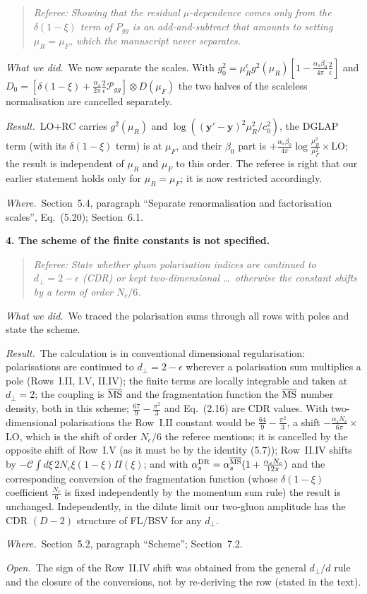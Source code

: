 \documentclass[a4paper,11pt]{article}
\def\v#1{\mathbf{#1}}
\newcommand{\MS}{\overline{\rm MS}}
\newcommand{\point}[1]{\par\medskip\noindent\textbf{#1}\par}
\newcommand{\referee}[1]{\begin{quote}\small\emph{Referee:} \emph{#1}\end{quote}}
\newcommand{\done}{\par\noindent\emph{What we did.}\ }
\newcommand{\result}{\par\noindent\emph{Result.}\ }
\newcommand{\where}{\par\noindent\emph{Where.}\ }
\newcommand{\open}{\par\noindent\emph{Open.}\ }
\begin{document}
\referee{Showing that the residual $\mu$-dependence comes only from the $\delta(1-\xi)$ term of $P_{gg}$ is an add-and-subtract that amounts to setting $\mu_R=\mu_F$, which the manuscript never separates.}
\done We now separate the scales. With $g_0^2=\mu_R^\epsilon g^2(\mu_R)[1-\frac{\alpha_s\beta_0}{4\pi}\frac2\epsilon]$ and $D_0=[\delta(1-\xi)+\frac{\alpha_s}{2\pi}\frac2\epsilon\mathcal P_{gg}]\otimes D(\mu_F)$ the two halves of the scaleless normalisation are cancelled separately.
\result LO$+$RC carries $g^2(\mu_R)$ and $\log((\v y'-\v y)^2\mu_R^2/c_0^2)$, the DGLAP term (with its $\delta(1-\xi)$ term) is at $\mu_F$, and their $\beta_0$ part is $+\frac{\alpha_s\beta_0}{4\pi}\log\frac{\mu_R^2}{\mu_F^2}\times$LO; the result is independent of $\mu_R$ and $\mu_F$ to this order. The referee is right that our earlier statement holds only for $\mu_R=\mu_F$; it is now restricted accordingly.
\where Section~5.4, paragraph ``Separate renormalisation and factorisation scales'', Eq.~(5.20); Section~6.1.

\point{4. The scheme of the finite constants is not specified.}
\referee{State whether gluon polarisation indices are continued to $d_\perp=2-\epsilon$ (CDR) or kept two-dimensional \dots\ otherwise the constant shifts by a term of order $N_c/6$.}
\done We traced the polarisation sums through all rows with poles and state the scheme.
\result The calculation is in conventional dimensional regularisation: polarisations are continued to $d_\perp=2-\epsilon$ wherever a polarisation sum multiplies a pole (Rows~I.II, I.V, II.IV); the finite terms are locally integrable and taken at $d_\perp=2$; the coupling is $\MS$ and the fragmentation function the $\MS$ number density, both in this scheme; $\frac{67}{9}-\frac{\pi^2}{3}$ and Eq.~(2.16) are CDR values. With two-dimensional polarisations the Row~I.II constant would be $\frac{64}{9}-\frac{\pi^2}{3}$, a shift $-\frac{\alpha_sN_c}{6\pi}\times$LO, which is the shift of order $N_c/6$ the referee mentions; it is cancelled by the opposite shift of Row~I.V (as it must be by the identity (5.7)); Row~II.IV shifts by $-\mathcal C\int d\xi\,2N_c\xi(1-\xi)\Pi(\xi)$; and with $\alpha_s^{\rm DR}=\alpha_s^{\MS}(1+\frac{\alpha_sN_c}{12\pi})$ and the corresponding conversion of the fragmentation function (whose $\delta(1-\xi)$ coefficient $\frac{N_c}{6}$ is fixed independently by the momentum sum rule) the result is unchanged. Independently, in the dilute limit our two-gluon amplitude has the CDR $(D-2)$ structure of FL/BSV for any $d_\perp$.
\where Section~5.2, paragraph ``Scheme''; Section~7.2.
\open The sign of the Row~II.IV shift was obtained from the general $d_\perp/d$ rule and the closure of the conversions, not by re-deriving the row (stated in the text).
\end{document}
